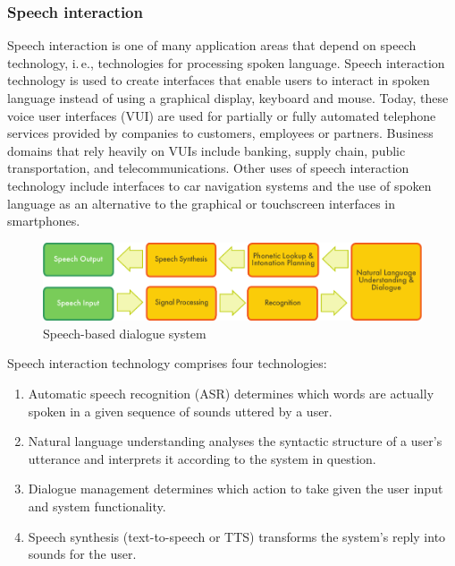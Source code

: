 \begin{multicols}{2}
  \subsubsection{Speech interaction}

  Speech interaction is one of many application areas that depend on speech technology, i.\,e., technologies for processing spoken language. Speech interaction technology is used to create interfaces that enable users to interact in spoken language instead of using a graphical display, keyboard and mouse. Today, these voice user interfaces (VUI) are used for partially or fully automated telephone services provided by companies to customers, employees or partners. Business domains that rely heavily on VUIs include banking, supply chain, public transportation, and telecommunications. Other uses of speech interaction technology include interfaces to car navigation systems and the use of spoken language as an alternative to the graphical or touchscreen interfaces in smartphones.

  \begin{figure}[htb]
    \center
    \includegraphics[width=\textwidth]{../_media/english/simple_speech-based_dialogue_architecture}
    \caption{Speech-based dialogue system}
    \label{fig:dialoguearch_en}
  \end{figure}

  Speech interaction technology comprises four technologies: 

  \begin{enumerate}
        \item Automatic speech recognition (ASR) determines which words are actually spoken in a given sequence of sounds uttered by a user.
        \item Natural language understanding analyses the syntactic structure of a user's utterance and interprets it according to the system in question.
        \item Dialogue management determines which action to take given the user input and system functionality.    
        \item Speech synthesis (text-to-speech or TTS) transforms the system's reply into sounds for the user.
      \end{enumerate}


\end{multicols}
